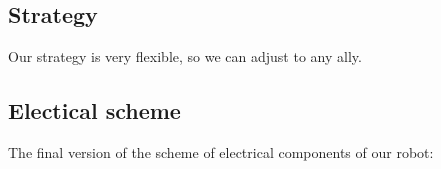 \subsection{Strategy}
Our strategy is very flexible, so we can adjust to any ally.
\subsection{Electical scheme}
The final version of the scheme of electrical components of our robot:
\begin{figure}[H]
	\begin{minipage}[h]{1\linewidth}
	\end{minipage}
\end{figure}
\newpage

